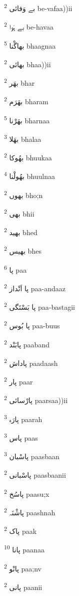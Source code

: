 \documentclass[12pt]{article}
\begin{document}
\begin{multicols}{5}
{\ur بے وَفائی}   \textsuperscript{2} be-vafaa))ii

{\ur بے ہَوا}   \textsuperscript{2} be-havaa

{\ur بھاگْنا}   \textsuperscript{5} bhaagnaa

{\ur بھائی}   \textsuperscript{2} bhaa))ii

{\ur بھَر}   \textsuperscript{2} bhar

{\ur بھَرَم}   \textsuperscript{2} bharam

{\ur بھَرْنا}   \textsuperscript{5} bharnaa

{\ur بھَلا}   \textsuperscript{3} bhalaa

{\ur بھُوکا}   \textsuperscript{2} bhuukaa

{\ur بھُولْنا}   \textsuperscript{4} bhuulnaa

{\ur بھوں}   \textsuperscript{2} bho;n

{\ur بھی}   \textsuperscript{2} bhii

{\ur بھید}   \textsuperscript{2} bhed

{\ur بھیس}   \textsuperscript{2} bhes

{\ur پا}   \textsuperscript{6} paa

{\ur پا اَنْداز}   \textsuperscript{2} paa-andaaz

{\ur پا بَسْتَگی}   \textsuperscript{2} paa-bastagii

{\ur پا بُوس}   \textsuperscript{2} paa-buus

{\ur پابَنْد}   \textsuperscript{2} paaband

{\ur پاداش}   \textsuperscript{2} paadaash

{\ur پار}   \textsuperscript{2} paar

{\ur پارْسائی}   \textsuperscript{2} paarsaa))ii

{\ur پارَہ}   \textsuperscript{3} paarah

{\ur پاس}   \textsuperscript{3} paas

{\ur پاسْبان}   \textsuperscript{3} paasbaan

{\ur پاسْبانی}   \textsuperscript{2} paasbaanii

{\ur پاسُخ}   \textsuperscript{2} paasu;x

{\ur پاشْنَہ}   \textsuperscript{2} paashnah

{\ur پاک}   \textsuperscript{2} paak

{\ur پانا}   \textsuperscript{10} paanaa

{\ur پانْو}   \textsuperscript{2} paa;nv

{\ur پانی}   \textsuperscript{2} paanii


\end{multicols}
\end{document}
